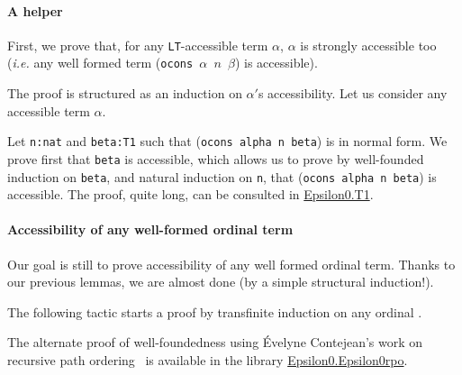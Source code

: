 \label{sec:orgheadline81}
\label{proof-wf-epsilon0}
\paragraph{A helper}
\label{sec:orgheadline79}

First, we prove that, for  any \texttt{LT}-accessible term $\alpha$, $\alpha$ is 
strongly accessible too (\emph{i.e.} any well formed
term (\texttt{ocons $\alpha$ $n$ $\beta$})  is accessible).

The proof is structured as an induction on $\alpha'$s accessibility. Let us consider
any  accessible term $\alpha$.





Let \texttt{n:nat} and \texttt{beta:T1} such that (\texttt{ocons alpha n beta}) is in normal form. 
We prove first that \texttt{beta} is accessible,  which allows us to prove by well-founded induction on \texttt{beta}, 
and natural induction on \texttt{n}, that (\texttt{ocons alpha n beta}) is accessible.
The proof, quite long, can be consulted in \href{../theories/html/hydras.Epsilon0.T1.html}{Epsilon0.T1}.

\paragraph{Accessibility of any well-formed ordinal term}
\label{sec:orgheadline80}

Our goal is still to prove accessibility of any well formed ordinal term.
Thanks to our previous lemmas, we are almost done (by a simple structural induction!).










The following tactic starts a proof by  transfinite induction on any ordinal .




\begin{remark}
\label{remark:a3pat}
The alternate proof of well-foundedness using \'Evelyne Contejean's work on
    recursive path ordering~\cite{DershowitzRPO, a3pat} is available in the
    library \href{../theories/html/hydras.Epsilon0.Epsilon0rpo.html}{Epsilon0.Epsilon0rpo}.
 \end{remark}


